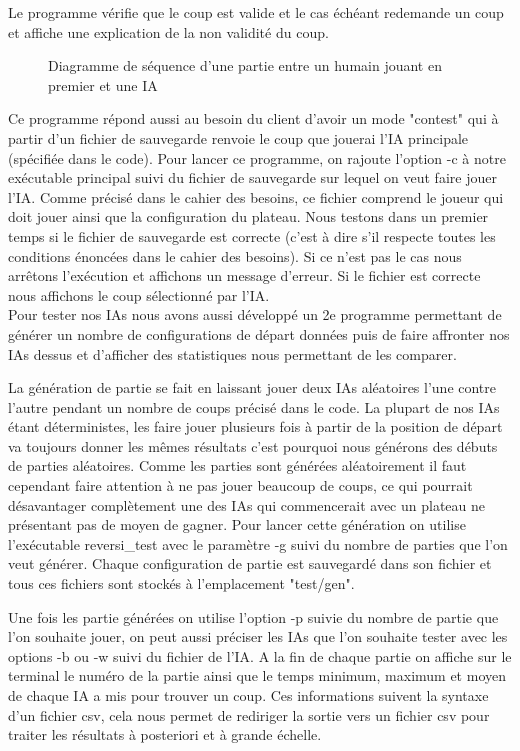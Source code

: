 \documentclass[12pt]{article}
\begin{document}
Le programme vérifie que le coup est valide et le cas échéant redemande un coup et affiche une explication de la non validité du coup.

\begin{figure}[H]

\caption{Diagramme de séquence d'une partie entre un humain jouant en premier et une IA}
\end{figure}

Ce programme répond aussi au besoin du client d'avoir un mode "contest" qui à partir d'un fichier de sauvegarde renvoie le coup que jouerai l'IA principale (spécifiée dans le code). Pour lancer ce programme, on rajoute l’option -c à notre exécutable principal suivi du fichier de sauvegarde sur lequel on veut faire jouer l'IA. Comme précisé dans le cahier des besoins, ce fichier comprend le joueur qui doit jouer ainsi que la configuration du plateau. 
Nous testons dans un premier temps si le fichier de sauvegarde est correcte (c'est à dire s'il respecte toutes les conditions énoncées dans le cahier des besoins). Si ce n'est pas le cas nous arrêtons l’exécution et affichons un message d'erreur. Si le fichier est correcte nous affichons le coup sélectionné par l'IA.\\

Pour tester nos IAs nous avons aussi développé un 2e programme permettant de générer un nombre de configurations de départ données puis de faire affronter nos IAs dessus et d'afficher des statistiques nous permettant de les comparer.

La génération de partie se fait en laissant jouer deux IAs aléatoires l'une contre l'autre pendant un nombre de coups précisé dans le code. La plupart de nos IAs étant déterministes, les faire jouer plusieurs fois à partir de la position de départ va toujours donner les mêmes résultats c'est pourquoi nous générons des débuts de parties aléatoires. Comme les parties sont générées aléatoirement il faut cependant faire attention à ne pas jouer beaucoup de coups, ce qui pourrait désavantager complètement une des IAs qui commencerait avec un plateau ne présentant pas de moyen de gagner. Pour lancer cette génération on utilise l'exécutable reversi\_test avec le paramètre -g suivi du nombre de parties que l'on veut générer. Chaque configuration de partie est sauvegardé dans son fichier et tous ces fichiers sont stockés à l'emplacement "test/gen".

Une fois les partie générées on utilise l'option -p suivie du nombre de partie que l'on souhaite jouer, on peut aussi préciser les IAs que l'on souhaite tester avec les options -b ou -w suivi du fichier de l'IA. A la fin de chaque partie on affiche sur le terminal le numéro de la partie ainsi que le temps minimum, maximum et moyen de chaque IA a mis pour trouver un coup. Ces informations suivent la syntaxe d'un fichier csv, cela nous permet de rediriger la sortie vers un fichier csv pour traiter les résultats à posteriori et à grande échelle.
\end{document}

